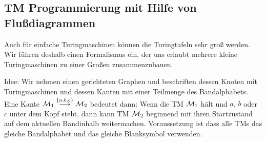% 
% 

\subsection{\ac{TM} Programmierung mit Hilfe von Flußdiagrammen}

Auch für einfache Turingmaschinen können die Turingtafeln sehr groß werden.
Wir führen deshalb einen Formalismus ein, der uns erlaubt mehrere kleine Turingmaschinen zu einer Großen zusammenzubauen.

Idee: Wir nehmen einen gerichteten Graphen und beschriften dessen Knoten mit Turingmaschinen und dessen Kanten mit einer Teilmenge des Bandalphabets.
Eine Kante $\mathcal{M}_1\stackrel{\{a,b,c\}}{\longrightarrow}\mathcal{M}_2$ bedeutet dann:
Wenn die TM $\mathcal{M}_1$ hält und $a$, $b$ oder $c$ unter dem Kopf steht, dann kann TM $\mathcal{M}_2$ beginnend mit ihren Startzustand auf dem aktuellen Bandinhalb weitermachen.
Voraussetzung ist dass alle TMs das gleiche Bandalphabet und das gleiche Blanksymbol verwenden.

